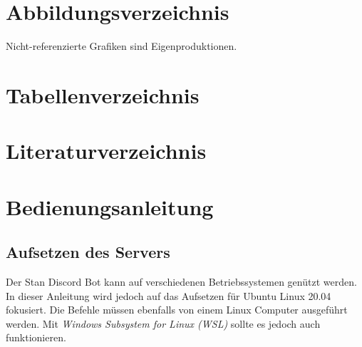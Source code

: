 \documentclass[a4paper, table]{article}
\begin{document}
\newpage
\section{Abbildungsverzeichnis}
\listoffigures

Nicht-referenzierte Grafiken sind Eigenproduktionen.

\section{Tabellenverzeichnis}
\listoftables

\section{Literaturverzeichnis}
\printbibliography

\newpage
\section{Bedienungsanleitung}\label{Bedienungsanleitung}

\subsection{Aufsetzen des Servers}

Der Stan Discord Bot kann auf verschiedenen Betriebssystemen genützt werden.
In dieser Anleitung wird jedoch auf das Aufsetzen für Ubuntu Linux 20.04 fokusiert.
Die Befehle müssen ebenfalls von einem Linux Computer ausgeführt werden.
Mit \textit{Windows Subsystem for Linux (WSL)} sollte es jedoch auch funktionieren.
\end{document}
